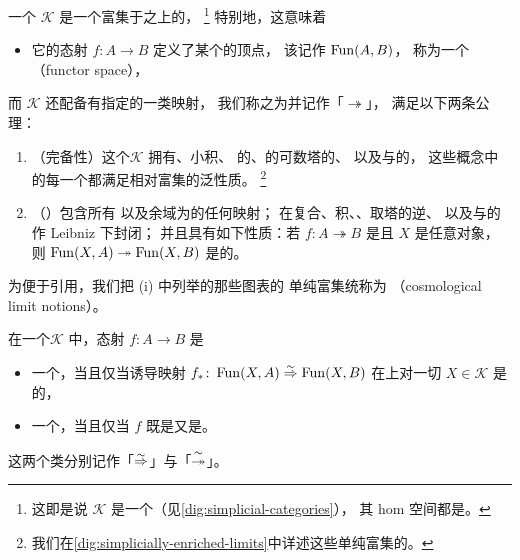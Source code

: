 \begin{definition}[\trInfinityCosmos]\label{def:infinity-cosmos}
一个\textbf{\trInfinityCosmos} $\mathcal{K}$
是一个富集于\trQuasiCategory{}之上的\trCategory{}，%
\footnote{这即是说 $\mathcal{K}$ 是一个\trSimpliciallyEnrichedCategory{}（见\cref{dig:simplicial-categories}），
其 hom 空间都是\trQuasiCategory{}。}
特别地，这意味着
\begin{itemize}
\item 它的态射 $f\colon A\to B$ 定义了某个\trQuasiCategory{}的顶点，
  该\trQuasiCategory{}记作 $\operatorname{Fun}(A,B)$，
  称为一个\textbf{\trFunctorSpace}（functor space），
\end{itemize}
而 $\mathcal{K}$ 还配备有指定的一类映射，
我们称之为\textbf{\trIsofibration{}}并记作「$\twoheadrightarrow$」，
满足以下两条公理：
\begin{enumerate}[label=(\roman*)]
\item （完备性）这个\trQuasiCategory\trEnrichedCategory $\mathcal{K}$ 拥有\trTerminal{}、小积、
  \trIsofibration{}的\trPullback{}、\trIsofibration{}的可数塔的\trLimit{}、
  以及与\trSimplicialSet{}的\trCotensor{}，
  这些\trLimit{}概念中的每一个都满足相对\trSimplicialSet{}富集的泛性质。%
  \footnote{我们在\cref{dig:simplicially-enriched-limits}中详述这些单纯富集的\trLimit{}。}
\item （\trIsofibration）\trIsofibration{}包含所有\trIsomorphism
  以及余域为\trTerminal{}的任何映射；
  在复合、积、\trPullback{}、取塔的逆\trLimit{}、
  以及与\trSimplicialSet{}的\trMonomorphism{}作 Leibniz \trCotensor{}下封闭；
  并且具有如下性质：若 $f\colon A\twoheadrightarrow B$
  是\trIsofibration{}且 $X$ 是任意对象，
  则 $\operatorname{Fun}(X,A)\twoheadrightarrow\operatorname{Fun}(X,B)$
  是\trQuasiCategory{}的\trIsofibration{}。
\end{enumerate}
\end{definition}

为便于引用，我们把 (i) 中列举的那些\trIsofibration{}图表的
单纯富集\trLimit{}统称为\textbf{\trCosmologicalLimitNotions}
（cosmological limit notions）。

\begin{definition}\label{def:equivalence-trivial-fibration}
在一个\trInfinityCosmos{}$\mathcal{K}$ 中，态射 $f\colon A\to B$ 是
\begin{itemize}
\item 一个\textbf{\trEquivalence}，当且仅当诱导映射
  $f_\ast\colon\operatorname{Fun}(X,A)\mathrel{\stackrel{\sim}{\Rightarrow}}\operatorname{Fun}(X,B)$
  在\trFunctorSpace{}上对一切 $X\in\mathcal{K}$
  是\trQuasiCategory{}的\trEquivalence{}，
\item 一个\textbf{\trTrivialFibration}，当且仅当 $f$
  既是\trIsofibration{}又是\trEquivalence{}。
\end{itemize}
这两个类分别记作「$\mathrel{\stackrel{\sim}{\Rightarrow}}$」与「$\mathrel{\stackrel{\sim}{\twoheadrightarrow}}$」。
\end{definition}

